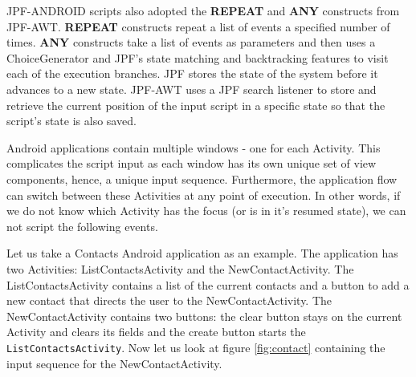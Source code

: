 \documentclass{acm_proc_article-sp}
\begin{document}
JPF-ANDROID scripts also adopted the \textbf{REPEAT} and \textbf{ANY} constructs from JPF-AWT. \textbf{REPEAT} constructs repeat a list of
events a specified number of times. \textbf{ANY} constructs take a list of events as parameters and then uses a ChoiceGenerator and JPF's
state matching and backtracking features to visit each of the execution branches. JPF stores the state of the system before it advances
to a new state. JPF-AWT uses a JPF search listener to store and retrieve the current position of the input script in a specific state so
that the script's state is also saved.

Android applications contain multiple windows - one for each Activity. This complicates the script input as each window has its own unique
set of view components, hence, a unique input sequence. Furthermore, the application flow can switch between these Activities
at any point of execution. In other words, if we do not know which Activity has the focus (or is in it's resumed state), we can not script
the following events.

Let us take a Contacts Android application as an example. The application has two Activities: ListContactsActivity and the
NewContactActivity. The ListContactsActivity contains a list of the current contacts and a button to add a new contact that directs the
user to the NewContactActivity. The NewContactActivity contains two buttons: the clear button stays on the current Activity and clears its
fields and the create button starts the \texttt{ListContactsActivity}. Now let us look at figure \ref{fig:contact} containing the input
sequence for the NewContactActivity.
\end{document}
